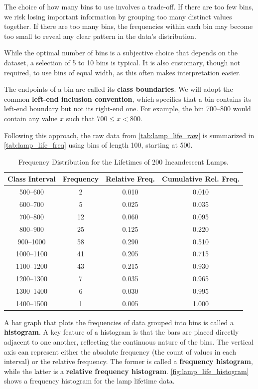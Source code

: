 The choice of how many bins to use involves a trade-off. If there are too few bins, we risk losing important information by grouping too many distinct values together. If there are too many bins, the frequencies within each bin may become too small to reveal any clear pattern in the data's distribution.

While the optimal number of bins is a subjective choice that depends on the dataset, a selection of 5 to 10 bins is typical. It is also customary, though not required, to use bins of equal width, as this often makes interpretation easier.

The endpoints of a bin are called its \textbf{class boundaries}. We will adopt the common \textbf{left-end inclusion convention}, which specifies that a bin contains its left-end boundary but not its right-end one. For example, the bin 700--800 would contain any value \(x\) such that \(700 \le x < 800\).

Following this approach, the raw data from \autoref{tab:lamp_life_raw} is summarized in \autoref{tab:lamp_life_freq} using bins of length 100, starting at 500.

\begin{table}[htbp]
\centering
\renewcommand{\arraystretch}{1.3}
{
\begin{tabular}{cccc}
\toprule
\textbf{Class Interval} & \textbf{Frequency} & \textbf{Relative Freq.} & \textbf{Cumulative Rel. Freq.} \\
\midrule
500--600   & 2   & 0.010 & 0.010 \\
600--700   & 5   & 0.025 & 0.035 \\
700--800   & 12  & 0.060 & 0.095 \\
800--900   & 25  & 0.125 & 0.220 \\
900--1000  & 58  & 0.290 & 0.510 \\
1000--1100 & 41  & 0.205 & 0.715 \\
1100--1200 & 43  & 0.215 & 0.930 \\
1200--1300 & 7   & 0.035 & 0.965 \\
1300--1400 & 6   & 0.030 & 0.995 \\
1400--1500 & 1   & 0.005 & 1.000 \\
\bottomrule
\end{tabular}
}
\caption{Frequency Distribution for the Lifetimes of 200 Incandescent Lamps.}
\label{tab:lamp_life_freq}
\end{table}

A bar graph that plots the frequencies of data grouped into bins is called a \textbf{histogram}. A key feature of a histogram is that the bars are placed directly adjacent to one another, reflecting the continuous nature of the bins. The vertical axis can represent either the absolute frequency (the count of values in each interval) or the relative frequency. The former is called a \textbf{frequency histogram}, while the latter is a \textbf{relative frequency histogram}. \autoref{fig:lamp_life_histogram} shows a frequency histogram for the lamp lifetime data.

